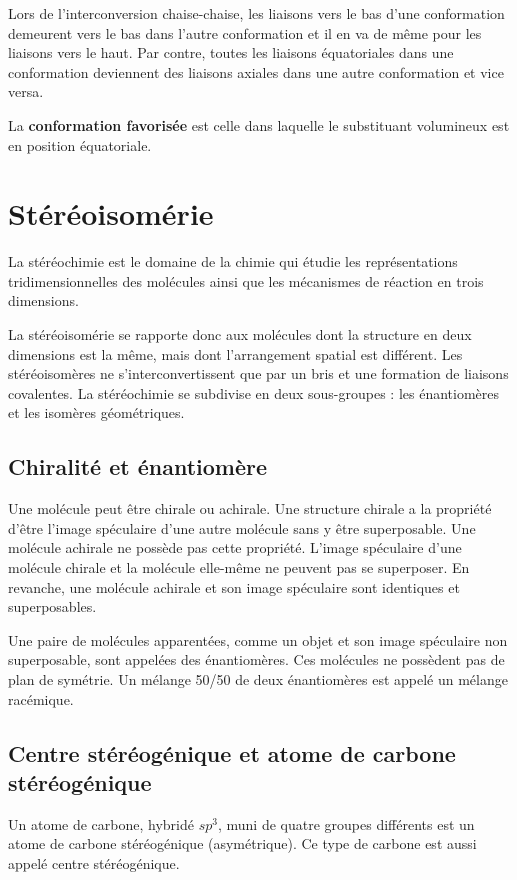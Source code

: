 Lors de l'interconversion chaise-chaise, les liaisons vers le bas d'une conformation demeurent vers le bas dans l'autre conformation et il en va de même pour les liaisons vers le haut.
Par contre, toutes les liaisons équatoriales dans une conformation deviennent des liaisons axiales dans une autre conformation et vice versa.

La \textbf{conformation favorisée} est celle dans laquelle le substituant volumineux est en position équatoriale.


\section{Stéréoisomérie}

La stéréochimie est le domaine de la chimie qui étudie les représentations tridimensionnelles des  molécules ainsi que les mécanismes de réaction en trois dimensions.

La stéréoisomérie se rapporte donc aux molécules dont la structure en deux dimensions est la même, mais dont l'arrangement spatial est différent.
Les stéréoisomères ne  s'interconvertissent que par un bris et une formation de liaisons covalentes.
La stéréochimie se subdivise en deux sous-groupes : les énantiomères et les isomères géométriques.

\subsection{Chiralité et énantiomère} Une molécule peut être chirale ou achirale.
Une structure chirale a la propriété d'être l'image spéculaire d'une autre molécule sans y être superposable.
Une molécule achirale ne possède pas cette propriété.
L'image spéculaire d'une molécule chirale et la molécule elle-même ne peuvent pas se superposer.
En revanche, une molécule achirale et son image spéculaire sont identiques et superposables.

Une paire de molécules apparentées, comme un objet et son image spéculaire non superposable, sont appelées des énantiomères.
Ces molécules ne possèdent pas de plan de symétrie.
Un mélange 50/50 de deux énantiomères est appelé un mélange racémique.

\subsection{Centre stéréogénique et atome de carbone stéréogénique}Un atome de carbone, hybridé $sp^3$, muni de quatre groupes différents est un atome de carbone stéréogénique (asymétrique).
Ce type de carbone est aussi appelé centre stéréogénique.

